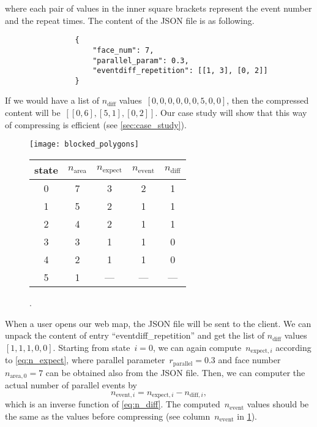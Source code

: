 \documentclass[ijgi,article,submit,moreauthors,pdftex]{Definitions/mdpi}
\begin{document}
where each pair of values in the inner square brackets 
represent the event number and the repeat times.
The content of the JSON file is as following.
\begin{verbatim}
                {
                    "face_num": 7,
                    "parallel_param": 0.3,                    
                    "eventdiff_repetition": [[1, 3], [0, 2]]
                }
\end{verbatim}
If we would have a list of $n_\mathrm{diff}$ values~$[0, 0, 0, 0, 0, 0, 5, 0, 0]$,
then the compressed content will be~$[[0,6], [5,1], [0,2]]$.
Our case study will show that this way of compressing is efficient
(see \sect\ref{sec:case_study}).



\begin{figure}[tb]
\centering
\texttt{[image: blocked\_polygons]}
\caption{.
}
\label{fig:sequence_snap}
\vspace{6mm} %
%
%
%
\captionsetup*{type=table} %
\caption{.
}
\label{tab:sequence_snap}
\centering
\begin{tabular}{ccccc}
\hline
state & $n_\mathrm{area}$ & $n_\mathrm{expect}$ 
    & $n_\mathrm{event}$ & $n_\mathrm{diff}$ \\ \hline
0     & 7      & 3        & 2        & 1      \\
1     & 5      & 2        & 1        & 1      \\
2     & 4      & 2        & 1        & 1      \\
3     & 3      & 1        & 1        & 0      \\
4     & 2      & 1        & 1        & 0      \\
5     & 1      & ---      & ---      & ---    \\ \hline
\end{tabular}
\end{figure}



When a user opens our web map,
the JSON file will be sent to the client.
We can unpack the content of entry ``eventdiff\_repetition'' and 
get the list of $n_\mathrm{diff}$ values~$[1, 1, 1, 0, 0]$.
Starting from state~$i=0$,
we can again compute~$n_{\mathrm{expect},i}$ according to \eq\ref{eq:n_expect},
where parallel parameter~$r_\mathrm{parallel}=0.3$ 
and face number~$n_{\mathrm{area},0} = 7$
can be obtained also from the JSON file.
Then, we can computer the actual number of parallel events by
\begin{equation*}
\label{eq:n_event}
n_{\mathrm{event},i} = n_{\mathrm{expect},i} - n_{\mathrm{diff},i},
\end{equation*}
which is an inverse function of \eq\ref{eq:n_diff}.
The computed~$n_\mathrm{event}$ values 
should be the same as the values before compressing
(see column~$n_\mathrm{event}$ in \tbl\ref{tab:sequence_snap}).
\end{document}
